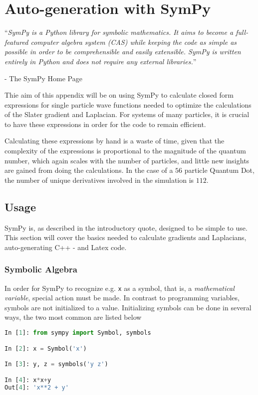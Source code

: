 \chapter{Auto-generation with SymPy}
\label{appendix:sympy}

``\textit{SymPy is a Python library for symbolic mathematics. It aims to become a full-featured computer algebra system (CAS) while keeping the code as simple as possible in order to be comprehensible and easily extensible. SymPy is written entirely in Python and does not require any external libraries.}'' 

\hfill - The SymPy Home Page \cite{SymPy}

\vspace{0.5cm}
Thie aim of this appendix will be on using SymPy to calculate closed form expressions for single particle wave functions needed to optimize the calculations of the Slater gradient and Laplacian. For systems of many particles, it is crucial to have these expressions in order for the code to remain efficient. 

Calculating these expressions by hand is a waste of time, given that the complexity of the expressions is proportional to the magnitude of the quantum number, which again scales with the number of particles, and little new insights are gained from doing the calculations. In the case of a $56$ particle Quantum Dot, the number of unique derivatives involved in the simulation is $112$. 

\section{Usage}

SymPy is, as described in the introductory quote, designed to be simple to use. This section will cover the basics needed to calculate gradients and Laplacians, auto-generating C++ - and Latex code.

\subsection{Symbolic Algebra}

In order for SymPy to recognize e.g. \verb+x+ as a symbol, that is, a \textit{mathematical variable}, special action must be made. In contrast to programming variables, symbols are not initialized to a value. Initializing symbols can be done in several ways, the two most common are listed below

\vspace{0.25cm}
\begin{lstlisting}[language=Python]
In [1]: from sympy import Symbol, symbols

In [2]: x = Symbol('x')

In [3]: y, z = symbols('y z')

In [4]: x*x+y
Out[4]: 'x**2 + y'

\end{lstlisting}

